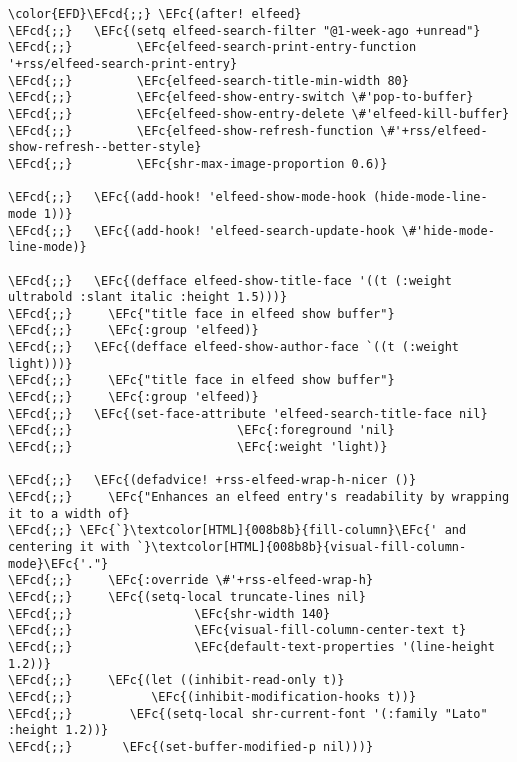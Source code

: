 \documentclass[12pt]{article}
\theoremstyle{plain}%
\theoremstyle{definition}
\theoremstyle{remark}
\newcommand{\EFc}[1]{\textcolor{EFc}{#1}} %
\newcommand{\EFcd}[1]{\textcolor{EFcd}{#1}} %
\begin{document}
\begin{Code}
\begin{Verbatim}
\color{EFD}\EFcd{;;} \EFc{(after! elfeed}
\EFcd{;;}   \EFc{(setq elfeed-search-filter "@1-week-ago +unread"}
\EFcd{;;}         \EFc{elfeed-search-print-entry-function '+rss/elfeed-search-print-entry}
\EFcd{;;}         \EFc{elfeed-search-title-min-width 80}
\EFcd{;;}         \EFc{elfeed-show-entry-switch \#'pop-to-buffer}
\EFcd{;;}         \EFc{elfeed-show-entry-delete \#'elfeed-kill-buffer}
\EFcd{;;}         \EFc{elfeed-show-refresh-function \#'+rss/elfeed-show-refresh--better-style}
\EFcd{;;}         \EFc{shr-max-image-proportion 0.6)}

\EFcd{;;}   \EFc{(add-hook! 'elfeed-show-mode-hook (hide-mode-line-mode 1))}
\EFcd{;;}   \EFc{(add-hook! 'elfeed-search-update-hook \#'hide-mode-line-mode)}

\EFcd{;;}   \EFc{(defface elfeed-show-title-face '((t (:weight ultrabold :slant italic :height 1.5)))}
\EFcd{;;}     \EFc{"title face in elfeed show buffer"}
\EFcd{;;}     \EFc{:group 'elfeed)}
\EFcd{;;}   \EFc{(defface elfeed-show-author-face `((t (:weight light)))}
\EFcd{;;}     \EFc{"title face in elfeed show buffer"}
\EFcd{;;}     \EFc{:group 'elfeed)}
\EFcd{;;}   \EFc{(set-face-attribute 'elfeed-search-title-face nil}
\EFcd{;;}                       \EFc{:foreground 'nil}
\EFcd{;;}                       \EFc{:weight 'light)}

\EFcd{;;}   \EFc{(defadvice! +rss-elfeed-wrap-h-nicer ()}
\EFcd{;;}     \EFc{"Enhances an elfeed entry's readability by wrapping it to a width of}
\EFcd{;;} \EFc{`}\textcolor[HTML]{008b8b}{fill-column}\EFc{' and centering it with `}\textcolor[HTML]{008b8b}{visual-fill-column-mode}\EFc{'."}
\EFcd{;;}     \EFc{:override \#'+rss-elfeed-wrap-h}
\EFcd{;;}     \EFc{(setq-local truncate-lines nil}
\EFcd{;;}                 \EFc{shr-width 140}
\EFcd{;;}                 \EFc{visual-fill-column-center-text t}
\EFcd{;;}                 \EFc{default-text-properties '(line-height 1.2))}
\EFcd{;;}     \EFc{(let ((inhibit-read-only t)}
\EFcd{;;}           \EFc{(inhibit-modification-hooks t))}
\EFcd{;;}        \EFc{(setq-local shr-current-font '(:family "Lato" :height 1.2))}
\EFcd{;;}       \EFc{(set-buffer-modified-p nil)))}


\end{Verbatim}
\end{Code}
\end{document}
